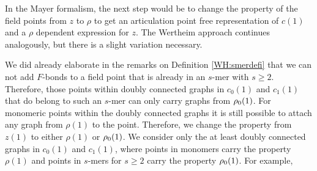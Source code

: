\documentclass[8.5pt,twoside,twocolumn]{article}
\newcommand\roz{\enmat{\rho_0}}
\theoremstyle{standard}
\begin{document}
In the Mayer formalism, the next step would be to change the property of the field points
from $z$ to $\rho$ to get an articulation point free representation of $c(1)$ and a 
$\rho$ dependent expression for $z$. The Wertheim approach continues analogously, but
there is a slight variation necessary.

We did already elaborate in the remarks on Definition \ref{WH:smerdefi} that we can not
add $F$-bonds to a field point that is already in an $s$-mer with $s \ge 2$. Therefore,
those points within doubly connected graphs in $c_0(1)$ and $c_1(1)$ that do belong
to such an $s$-mer can only carry graphs from $\roz(1)$. For monomeric points within the
doubly connected graphs it is still possible to attach any graph from $\rho(1)$ to the
point. Therefore, we change the property from $z(1)$ to either $\rho(1)$ or $\roz(1)$.
We consider only the at least doubly connected graphs in $c_0(1)$ and $c_1(1)$, where
points in monomers carry the property $\rho(1)$ and points in $s$-mers for $s\ge 2$
carry the property $\roz(1)$. For example,
\end{document}
